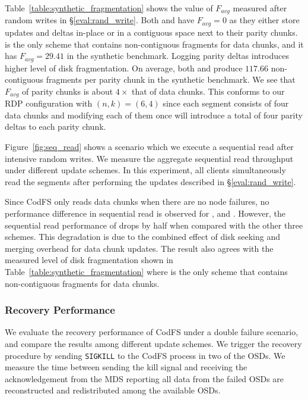 Table~\ref{table:synthetic_fragmentation} shows the value of $F_{avg}$
measured after random writes in \S\ref{eval:rand_write}.  Both \FO and \PLR have $F_{avg} = 0$
as they either store updates and deltas in-place or in a contiguous space next
to their parity chunks.  \FL is the only scheme that contains
non-contiguous fragments for data chunks, and it has $F_{avg} = 29.41$ in the
synthetic benchmark. 
Logging parity deltas introduces higher level of disk fragmentation. On
average, both \FL and \PL produce $117.66$ non-contiguous fragments per parity
chunk in the synthetic benchmark. We see that $F_{avg}$ of parity chunks is
about $4\times$ that of data chunks. This conforms to our RDP configuration
with $(n,k)=(6,4)$ since each segment consists of four data chunks and modifying
each of them once will introduce a total of four parity deltas to each parity
chunk. 

Figure~\ref{fig:seq_read} shows a scenario which we execute a sequential read
after intensive random writes. We measure the aggregate sequential read
throughput under different update schemes.  In this experiment, all clients
simultaneously read the segments after performing the updates described in
\S\ref{eval:rand_write}.

Since CodFS only reads data chunks when there are no node failures, no
performance difference in sequential read is observed for \FO, \PL and \PLR.
However,  the sequential read performance of \FL drops by half when
compared with the other three schemes. This degradation is due to the combined
effect of disk seeking and merging overhead for data chunk updates. The result
also agrees with the measured level of disk fragmentation shown in
Table~\ref{table:synthetic_fragmentation} where \FL is the only scheme that
contains non-contiguous fragments for data chunks.

\subsubsection{Recovery Performance}
\label{eval:recovery}


We evaluate the recovery performance of CodFS under a double failure scenario,
and compare the results among different update schemes. We trigger the recovery
procedure by sending \texttt{SIGKILL} to the CodFS process in two of the OSDs.
We measure the time between sending the kill signal and receiving the
acknowledgement from the MDS reporting all data from the failed OSDs
are reconstructed and redistributed among the available OSDs.

